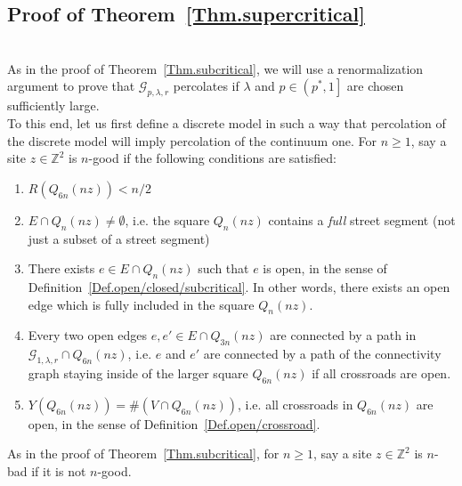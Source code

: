\documentclass[10pt,a4paper]{amsart}
\theoremstyle{exampstyle}
\theoremstyle{exampnotations}
\begin{document}
\subsection{Proof of Theorem~\ref{Thm.supercritical}}\mbox{}\\
As in the proof of Theorem~\ref{Thm.subcritical}, we will use a renormalization argument to prove that $\mathcal{G}_{p,\lambda,r}$ percolates if $\lambda$ and $p \in \left(p^{*},1\right]$ are chosen sufficiently large. \\
To this end, let us first define a discrete model in such a way that percolation of the discrete model will imply percolation of the continuum one. For $n \geq 1$, say a site $z \in \mathbb{Z}^{2}$ is $n$-good if the following conditions are satisfied:
\begin{enumerate}
\item $R(Q_{6n}(nz)) < n/2$ %
\item $E \cap Q_n(nz) \neq \emptyset$, i.e. the square $Q_n(nz)$ contains a \emph{full} street segment (not just a subset of a street segment)
\item There exists $e \in E \cap Q_n(nz)$ such that $e$ is open, in the sense of Definition~\ref{Def.open/closed/subcritical}. In other words, there exists an open edge which is fully included in the square $Q_n(nz)$.
\item Every two open edges $e,e' \in E \cap Q_{3n}(nz)$ are connected by a path in $\mathcal{G}_{1,\lambda,r}\cap Q_{6n}(nz)$, i.e. $e$ and $e'$ are connected by a path of the connectivity graph staying inside of the larger square $Q_{6n}(nz)$ if all crossroads are open.
\item $Y(Q_{6n}(nz)) = \#(V \cap Q_{6n}(nz))$, i.e. all crossroads in $Q_{6n}(nz)$ are open, in the sense of Definition~\ref{Def.open/crossroad}.
\end{enumerate}
As in the proof of Theorem~\ref{Thm.subcritical}, for $n \geq 1$, say a site $z \in \mathbb{Z}^{2}$ is $n$-bad if it is not $n$-good. \\
\end{document}
